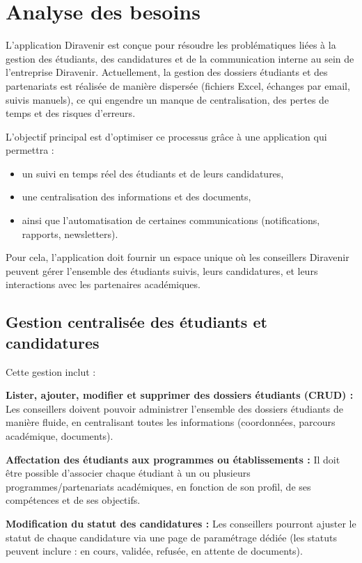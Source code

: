 \documentclass[12pt,a4paper]{report}
\begin{document}
\section{Analyse des besoins}

L'application Diravenir est conçue pour résoudre les problématiques liées à la gestion des étudiants, des candidatures et de la communication interne au sein de l'entreprise Diravenir. Actuellement, la gestion des dossiers étudiants et des partenariats est réalisée de manière dispersée (fichiers Excel, échanges par email, suivis manuels), ce qui engendre un manque de centralisation, des pertes de temps et des risques d'erreurs.

L'objectif principal est d'optimiser ce processus grâce à une application qui permettra :
\begin{itemize}
    \item un suivi en temps réel des étudiants et de leurs candidatures,
    \item une centralisation des informations et des documents,
    \item ainsi que l'automatisation de certaines communications (notifications, rapports, newsletters).
\end{itemize}

Pour cela, l'application doit fournir un espace unique où les conseillers Diravenir peuvent gérer l'ensemble des étudiants suivis, leurs candidatures, et leurs interactions avec les partenaires académiques.

\subsection{Gestion centralisée des étudiants et candidatures}

Cette gestion inclut :

\textbf{Lister, ajouter, modifier et supprimer des dossiers étudiants (CRUD) :}
Les conseillers doivent pouvoir administrer l'ensemble des dossiers étudiants de manière fluide, en centralisant toutes les informations (coordonnées, parcours académique, documents).

\textbf{Affectation des étudiants aux programmes ou établissements :}
Il doit être possible d'associer chaque étudiant à un ou plusieurs programmes/partenariats académiques, en fonction de son profil, de ses compétences et de ses objectifs.

\textbf{Modification du statut des candidatures :}
Les conseillers pourront ajuster le statut de chaque candidature via une page de paramétrage dédiée (les statuts peuvent inclure : en cours, validée, refusée, en attente de documents).
\end{document}
